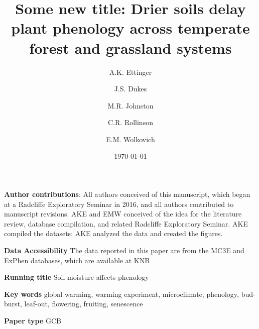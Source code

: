 \documentclass{article}
\begin{document}



\title{Some new title: Drier soils delay plant phenology across temperate forest and grassland systems} 
\author[1,2,a]{A.K. Ettinger}
\author[3,b]{J.S. Dukes}
\author[4,c]{M.R. Johnston}
\author[5,d]{C.R. Rollinson}
\author[1,4,6,e]{E.M. Wolkovich}









\date{\today}
\maketitle 
\textbf{Author contributions}: All authors conceived of this manuscript, which began at a Radcliffe Exploratory Seminar in 2016, and all authors contributed to manuscript revisions. AKE and EMW conceived of the idea for the literature review, database compilation, and related Radcliffe Exploratory Seminar. AKE compiled the datasets; AKE analyzed the data and created the figures.

\textbf{Data Accessibility} 
The data reported in this paper are from the MC3E and ExPhen databases, which are available at KNB \citep{ettinger2018,ettinger2022}

\textbf{Running title} Soil moisture affects phenology

\textbf{Key words} global warming, warming experiment, microclimate, phenology, bud-burst, leaf-out, flowering, fruiting, senescence 


\textbf{Paper type} GCB %
\end{document}
